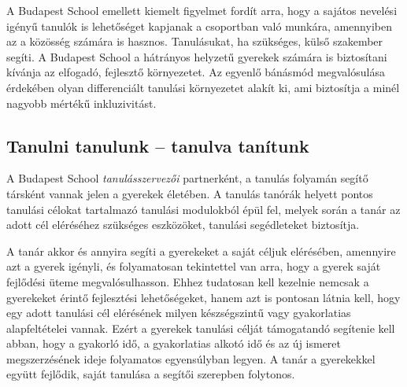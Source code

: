 A Budapest School emellett kiemelt figyelmet fordít arra, hogy a sajátos nevelési igényű tanulók is lehetőséget kapjanak a csoportban való munkára, amennyiben az a közösség számára is hasznos. Tanulásukat, ha szükséges, külső szakember segíti. A Budapest School a hátrányos helyzetű gyerekek számára is biztosítani kívánja az elfogadó, fejlesztő környezetet. Az egyenlő bánásmód megvalósulása érdekében olyan differenciált tanulási környezetet alakít ki, ami biztosítja a minél nagyobb mértékű inkluzivitást.

\subsection{Tanulni tanulunk -- tanulva tanítunk}
A Budapest School \emph{tanulásszervezői} partnerként, a tanulás folyamán segítő társként vannak jelen a gyerekek életében. A tanulás tanórák helyett pontos tanulási célokat tartalmazó tanulási modulokból épül fel, melyek során a tanár az adott cél eléréséhez szükséges eszközöket, tanulási segédleteket biztosítja.

A tanár akkor és annyira segíti a gyerekeket a saját céljuk elérésében, amennyire azt a gyerek igényli, és folyamatosan tekintettel van arra, hogy a gyerek saját fejlődési üteme megvalósulhasson. Ehhez tudatosan kell kezelnie nemcsak a gyerekeket érintő fejlesztési lehetőségeket, hanem azt is pontosan látnia kell, hogy egy adott tanulási cél elérésének milyen készségszintű vagy gyakorlatias alapfeltételei vannak. Ezért a gyerekek tanulási célját támogatandó segítenie kell abban, hogy a gyakorló idő, a gyakorlatias alkotó idő és az új ismeret megszerzésének ideje folyamatos egyensúlyban legyen. A tanár a gyerekekkel együtt fejlődik, saját tanulása a segítői szerepben folytonos.
